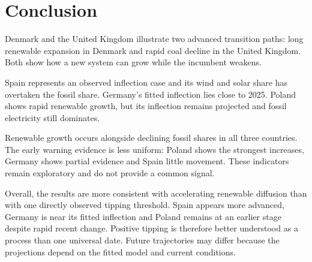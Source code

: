 \documentclass[
]{krantz}
\begin{document}
\section*{Conclusion}\label{conclusion-7}


Denmark and the United Kingdom illustrate two advanced transition paths: long renewable expansion in Denmark and rapid coal decline in the United Kingdom. Both show how a new system can grow while the incumbent weakens.

Spain represents an observed inflection case and its wind and solar share has overtaken the fossil share. Germany's fitted inflection lies close to 2025. Poland shows rapid renewable growth, but its inflection remains projected and fossil electricity still dominates.

Renewable growth occurs alongside declining fossil shares in all three countries. The early warning evidence is less uniform: Poland shows the strongest increases, Germany shows partial evidence and Spain little movement. These indicators remain exploratory and do not provide a common signal.

Overall, the results are more consistent with accelerating renewable diffusion than with one directly observed tipping threshold. Spain appears more advanced, Germany is near its fitted inflection and Poland remains at an earlier stage despite rapid recent change. Positive tipping is therefore better understood as a process than one universal date. Future trajectories may differ because the projections depend on the fitted model and current conditions.



\backmatter
\printindex
\end{document}
